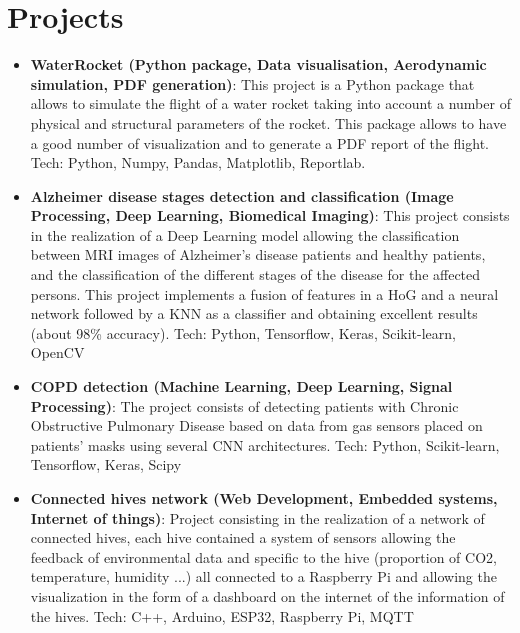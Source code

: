 \documentclass[a4paper,20pt]{article}
\newcommand{\resumeItem}[2]{
  \item\small{
    \textbf{#1}{: #2 \vspace{-2pt}}
  }
}
\newcommand{\resumeSubItem}[2]{\resumeItem{#1}{#2}\vspace{-3pt}}
\newcommand{\resumeSubHeadingListStart}{\begin{itemize}[leftmargin=*]}
\newcommand{\resumeSubHeadingListEnd}{\end{itemize}}
\begin{document}
\section{Projects}
  \resumeSubHeadingListStart
    \resumeSubItem{WaterRocket (Python package, Data visualisation, Aerodynamic simulation, PDF generation)}{This project is a Python package that allows to simulate the flight of a water rocket taking into account a number of physical and structural parameters of the rocket. This package allows to have a good number of visualization and to generate a PDF report of the flight. Tech: Python, Numpy, Pandas, Matplotlib, Reportlab.}
    \vspace{2pt}
    \resumeSubItem{Alzheimer disease stages detection and classification (Image Processing, Deep Learning, Biomedical Imaging)}{This project consists in the realization of a Deep Learning model allowing the classification between MRI images of Alzheimer's disease patients and healthy patients, and the classification of the different stages of the disease for the affected persons. This project implements a fusion of features in a HoG and a neural network followed by a KNN as a classifier and obtaining excellent results (about 98\% accuracy). Tech: Python, Tensorflow, Keras, Scikit-learn, OpenCV}
    \vspace{2pt}
    \resumeSubItem{COPD detection (Machine Learning, Deep Learning, Signal Processing)}{The project consists of detecting patients with Chronic Obstructive Pulmonary Disease based on data from gas sensors placed on patients' masks using several CNN architectures. Tech: Python, Scikit-learn, Tensorflow, Keras, Scipy}
    \vspace{2pt}
    \resumeSubItem{Connected hives network (Web Development, Embedded systems, Internet of things)}{Project consisting in the realization of a network of connected hives, each hive contained a system of sensors allowing the feedback of environmental data and specific to the hive (proportion of CO2, temperature, humidity ...) all connected to a Raspberry Pi and allowing the visualization in the form of a dashboard on the internet of the information of the hives. Tech: C++, Arduino, ESP32, Raspberry Pi, MQTT}
  \resumeSubHeadingListEnd
\vspace{-5pt}
\end{document}
